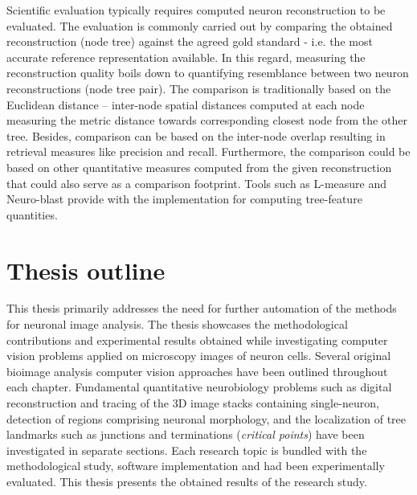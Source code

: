 Scientific evaluation typically requires computed neuron reconstruction to be evaluated. The evaluation is commonly carried out by comparing the obtained reconstruction (node tree) against the agreed gold standard - i.e. the most accurate reference representation available. In this regard, measuring the reconstruction quality boils down to quantifying resemblance between two neuron reconstructions (node tree pair). The comparison is traditionally based on the Euclidean distance -- inter-node spatial distances computed at each node measuring the metric distance towards corresponding closest node from the other tree. Besides, comparison can be based on the inter-node overlap resulting in retrieval measures like precision and recall. Furthermore, the comparison could be based on other quantitative measures computed from the given reconstruction that could also serve as a comparison footprint. Tools such as L-measure \cite{scorcioni2008measure} and Neuro-blast \cite{wan2015blastneuron} provide with the implementation for computing tree-feature quantities.  

\section{Thesis outline}
\label{sec:outline}
This thesis primarily addresses the need for further automation of the methods for neuronal image analysis. The thesis showcases the methodological contributions and experimental results obtained while investigating computer vision problems applied on microscopy images of neuron cells. Several original bioimage analysis computer vision approaches have been outlined throughout each chapter. Fundamental quantitative neurobiology problems such as digital reconstruction and tracing of the 3D image stacks containing single-neuron, detection of regions comprising neuronal morphology, and the localization of tree landmarks such as junctions and terminations (\textit{critical points}) have been investigated in separate sections. Each research topic is bundled with the methodological study, software implementation and had been experimentally evaluated. This thesis presents the obtained results of the research study.

